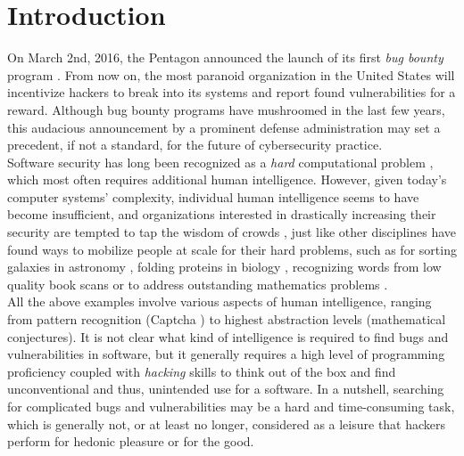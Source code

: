 \section{Introduction}
\label{sec:intro}
On March 2nd, 2016, the Pentagon announced the launch of its first {\it bug bounty} program \cite{Pentagon}. From now on, the most paranoid organization in the United States will incentivize hackers to break into its systems and report found vulnerabilities for a reward. Although bug bounty programs have mushroomed in the last few years, this audacious announcement by a prominent defense administration may set a precedent, if not a standard, for the future of cybersecurity practice.\\ 

Software security has long been recognized as a {\it hard} computational problem \cite{adams1984textordfeminineoptimizing}, which most often requires additional human intelligence. However, given today's computer systems' complexity, individual human intelligence seems to have become insufficient, and organizations interested in drastically increasing their security are tempted to tap the wisdom of crowds \cite{surowiecki2005wisdom}, just like other disciplines have found ways to mobilize people at scale for their hard problems, such as for sorting galaxies in astronomy \cite{smith2013introduction}, folding proteins in biology \cite{khatib2011algorithm}, recognizing words from low quality book scans \cite{von2003captcha} or to address outstanding mathematics problems \cite{gowers2009massively,cranshaw2011polymath}.\\

All the above examples involve various aspects of human intelligence, ranging from pattern recognition (Captcha \cite{von2003captcha}) to highest abstraction levels (mathematical conjectures). It is not clear what kind of intelligence is required to find bugs and vulnerabilities in software, but it generally requires a high level of programming proficiency coupled with {\it hacking} skills to think out of the box and find unconventional  and thus, unintended use for a software. In a nutshell, searching for complicated  bugs and vulnerabilities may be a hard and time-consuming task, which is generally not, or at least no longer, considered as a leisure that hackers perform for hedonic pleasure or for the good.\\

